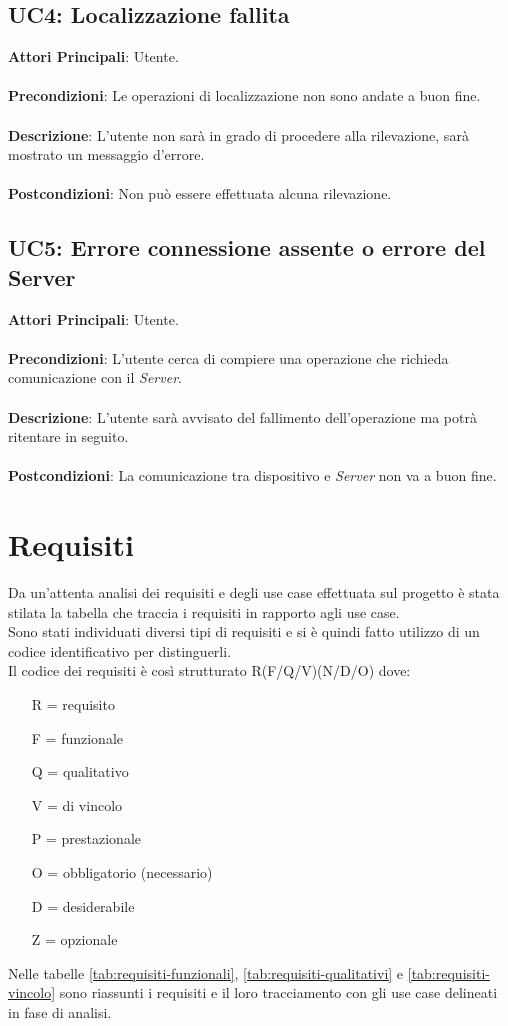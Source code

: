 \subsection{UC4: Localizzazione fallita}
\textbf{Attori Principali}: Utente.
\\\\ \textbf{Precondizioni}: Le operazioni di localizzazione non sono andate a buon fine.
\\\\ \textbf{Descrizione}: L'utente non sarà in grado di procedere alla rilevazione, sarà mostrato un messaggio d'errore.
\\\\ \textbf{Postcondizioni}: Non può essere effettuata alcuna rilevazione.


\subsection{UC5: Errore connessione assente o errore del Server}
\textbf{Attori Principali}: Utente.
\\\\ \textbf{Precondizioni}: L'utente cerca di compiere una operazione che richieda comunicazione con il \emph{Server}.
\\\\ \textbf{Descrizione}: L'utente sarà avvisato del fallimento dell'operazione ma potrà ritentare in seguito.
\\\\ \textbf{Postcondizioni}: La comunicazione tra dispositivo e \emph{Server} non va a buon fine.



\section{Requisiti}

Da un'attenta analisi dei requisiti e degli use case effettuata sul progetto è stata stilata la tabella che traccia i requisiti in rapporto agli use case.\\
Sono stati individuati diversi tipi di requisiti e si è quindi fatto utilizzo di un codice identificativo per distinguerli.\\
Il codice dei requisiti è così strutturato R(F/Q/V)(N/D/O) dove:
\begin{enumerate}
	\item[R =] requisito
	
    \item[F =] funzionale
    \item[Q =] qualitativo
    \item[V =] di vincolo
    \item[P =] prestazionale
    
    \item[O =] obbligatorio (necessario)
    \item[D =] desiderabile
    \item[Z =] opzionale
\end{enumerate}
Nelle tabelle \ref{tab:requisiti-funzionali}, \ref{tab:requisiti-qualitativi} e \ref{tab:requisiti-vincolo} sono riassunti i requisiti e il loro tracciamento con gli use case delineati in fase di analisi.

